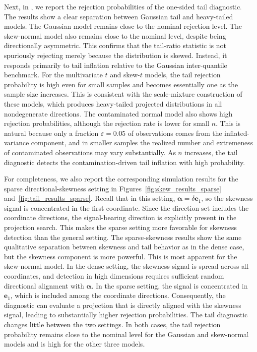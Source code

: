 \documentclass[11pt]{article}
\theoremstyle{plain}
\theoremstyle{definition}
\theoremstyle{remark}
\newcommand{\boldalpha}{\bm{\alpha}}
\begin{document}
Next, in , we report the rejection probabilities of the one-sided tail diagnostic.  The results show a clear separation between Gaussian tail and heavy-tailed models.  The Gaussian model remains close to the nominal rejection level.  The skew-normal model also remains close to the nominal level, despite being directionally asymmetric.  This confirms that the tail-ratio statistic is not spuriously rejecting merely because the distribution is skewed.  Instead, it responds primarily to tail inflation relative to the Gaussian inter-quantile benchmark. For the multivariate $t$ and skew-$t$ models, the tail rejection probability is high even for small samples and becomes essentially one as the sample size increases.  This is consistent with the scale-mixture construction of these models, which produces heavy-tailed projected distributions in all nondegenerate directions.  The contaminated normal model also shows high rejection probabilities, although the rejection rate is lower for small $n$.  This is natural because only a fraction $\varepsilon=0.05$ of observations comes from the inflated-variance component, and in smaller samples the realized number and extremeness of contaminated observations may vary substantially.  As $n$ increases, the tail diagnostic detects the contamination-driven tail inflation with high probability.

For completeness, we also report the corresponding simulation results for the sparse directional-skewness setting in Figures~\ref{fig:skew_results_sparse} and~\ref{fig:tail_results_sparse}.  Recall that in this setting, $\boldalpha=\delta \bm{e}_1$, so the skewness signal is concentrated in the first coordinate.  Since the direction set includes the coordinate directions, the signal-bearing direction is explicitly present in the projection search.  This makes the sparse setting more favorable for skewness detection than the general setting. The sparse-skewness results show the same qualitative separation between skewness and tail behavior as in the dense case, but the skewness component is more powerful.  This is most apparent for the skew-normal model.  In the dense setting, the skewness signal is spread across all coordinates, and detection in high dimensions requires sufficient random directional alignment with $\boldalpha$.  In the sparse setting, the signal is concentrated in $\bm{e}_1$, which is included among the coordinate directions.  Consequently, the diagnostic can evaluate a projection that is directly aligned with the skewness signal, leading to substantially higher rejection probabilities. The tail diagnostic changes little between the two settings. In both cases, the tail rejection probability remains close to the nominal level for the Gaussian and skew-normal models and is high for the other three models.
\end{document}
